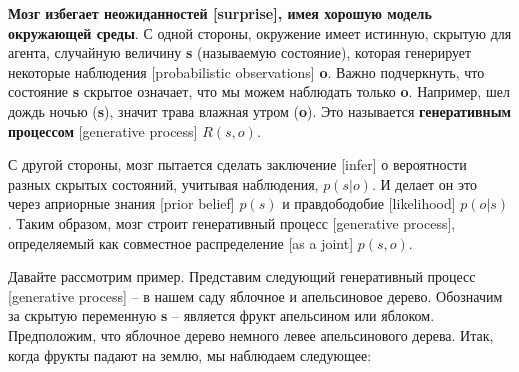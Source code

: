 \documentclass[twoside,leqno, 11pt]{article}
\begin{document}
	\textbf{Мозг избегает неожиданностей [surprise], имея хорошую модель окружающей среды}. С одной стороны, окружение имеет истинную, скрытую для агента, случайную величину \textbf{s} (называемую состояние), которая генерирует некоторые наблюдения [probabilistic observations] \textbf{o}. Важно подчеркнуть, что состояние \textbf{s} скрытое означает, что мы можем наблюдать только \textbf{o}. Например, шел дождь ночью (\textbf{s}), значит трава влажная утром (\textbf{o}). Это называется \textbf{генеративным процессом} [generative process] $R(s,o)$.
	
	\begin{figure}[h]
		\label{ris:image}
	\end{figure}
	
	С другой стороны, мозг пытается сделать заключение [infer] о вероятности разных скрытых состояний, учитывая наблюдения, $p(s|o)$. И делает он это через априорные знания [prior belief] $p(s)$ и правдободобие [likelihood] $p(o|s)$. Таким образом, мозг строит генеративный процесс [generative process], определяемый как совместное распределение [as a joint] $p(s,o)$.
	
	\newpage

	\begin{figure}[h!]
		\label{ris:image}
	\end{figure}
	
	Давайте рассмотрим пример. Представим следующий генеративный процесс [generative process] -- в нашем саду яблочное и апельсиновое дерево. Обозначим за скрытую переменную \textbf{s} -- является фрукт апельсином или яблоком. Предположим, что яблочное дерево немного левее апельсинового дерева. Итак, когда фрукты падают на землю, мы наблюдаем следующее:
\end{document}
